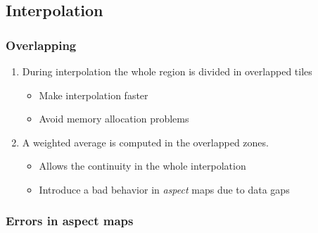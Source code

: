 \subsection{Interpolation}
\begin{frame}
    \frametitle{Overlapping}
    \begin{enumerate}
	\item During interpolation the whole region is divided in overlapped tiles
	\begin{itemize}
	   \item Make interpolation faster
	   \item Avoid memory allocation problems
	\end{itemize}
	\item A weighted average is computed in the overlapped zones. 
	\begin{itemize}
	   \item Allows the continuity in the whole interpolation
	   \item Introduce a bad behavior in \emph{aspect} maps due to data gaps
	\end{itemize}
    \end{enumerate}
    \begin{center}
    \end{center}
\end{frame}
\begin{frame}
    \frametitle{Errors in aspect maps}
    \begin{center}
    \end{center}
\end{frame}
